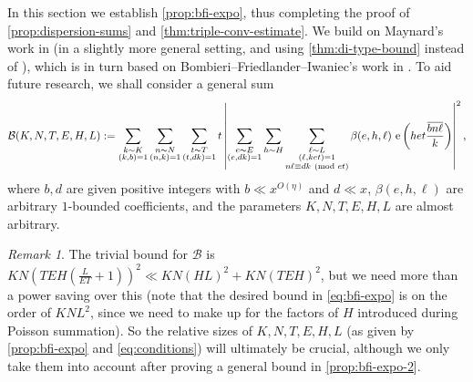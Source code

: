 \documentclass[reqno,11pt]{amsart}
\theoremstyle{definition}
\theoremstyle{remark}
\newtheorem*{remark}{Remark}
\numberwithin{equation}{section}
\newcommand{\mB}{\mathcal{B}}
\newcommand{\e}{\textnormal{e}}
\renewcommand{\bar}{\overline}
\renewcommand{\pmod}[1]{\ (\textnormal{mod } #1)}
\begin{document}
In this section we establish \cref{prop:bfi-expo}, thus completing the proof of \cref{prop:dispersion-sums} and \cref{thm:triple-conv-estimate}. We build on Maynard's work in \cite[\S 18]{maynard2020primes} (in a slightly more general setting, and using \cref{thm:di-type-bound} instead of \cite[Theorem 9]{deshouillers1982kloosterman}), which is in turn based on Bombieri--Friedlander--Iwaniec's work in \cite[\S 10]{bombieri1987primes2}. To aid future research, we shall consider a general sum
\[
    \mB(K, N, T, E, H, L) :=
    \sum_{\substack{k \sim K \\ (k, b) = 1}} 
    \sum_{\substack{n \sim N \\ (n, k) = 1}} 
    \sum_{\substack{t \sim T \\ (t, dk) = 1}} t \left\vert
    \sum_{\substack{e \sim E \\ (e, dk) = 1}}
    \sum_{h \sim H} 
    \sum_{\substack{\ell \sim L \\ (\ell, ket) = 1 \\ n \ell \equiv d k \pmod{et}}} 
    \beta(e, h, \ell)\ \e\left(het \frac{\bar{b n \ell}}{k}\right)
    \right\vert^2,
\]
where $b, d$ are given positive integers with $b \ll x^{O(\eta)}$ and $d \ll x$, $\beta(e, h, \ell)$ are arbitrary $1$-bounded coefficients, and the parameters $K, N, T, E, H, L$ are almost arbitrary. %

\begin{remark}
The trivial bound for $\mB$ is $KN\left(TEH\left(\frac{L}{ET} + 1\right)\right)^2 \ll KN(HL)^2 + KN(TEH)^2$, but we need more than a power saving over this (note that the desired bound in \cref{eq:bfi-expo} is on the order of $KNL^2$, since we need to make up for the factors of $H$ introduced during Poisson summation). So the relative sizes of $K, N, T, E, H, L$ (as given by \cref{prop:bfi-expo} and \cref{eq:conditions}) will ultimately be crucial, although we only take them into account after proving a general bound in \cref{prop:bfi-expo-2}.
\end{remark}
\end{document}
